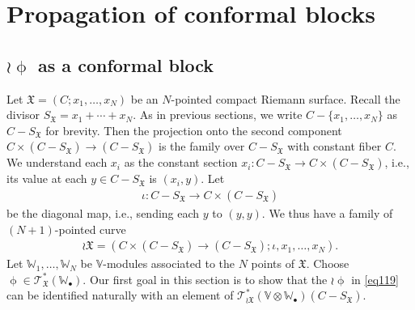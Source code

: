 \documentclass[12pt,b5paper,notitlepage]{report}
\theoremstyle{definition}
\theoremstyle{plain}
\newcommand{\fk}{\mathfrak}
\newcommand{\scr}{\mathscr}
\newcommand{\blt}{\bullet}
\newcommand{\Vbb}{\mathbb V}
\newcommand{\Wbb}{\mathbb W}
\numberwithin{equation}{section}
\begin{document}
\section{Propagation of conformal blocks}\label{lb149}



\subsection*{$\wr\upphi$ as a conformal block}


Let $\fk X=(C;x_1,\dots,x_N)$ be an $N$-pointed compact Riemann surface. Recall the divisor $S_{\fk X}=x_1+\cdots+x_N$. As in previous sections, we write $C-\{x_1,\dots,x_N\}$ as $C-S_{\fk X}$ for brevity. Then the projection onto the second component $C\times(C-S_{\fk X})\rightarrow (C-S_{\fk X})$ is the family over $C-S_{\fk X}$ with constant  fiber $C$. We understand each $x_i$ as the constant section $x_i:C-S_{\fk X}\rightarrow C\times (C-S_{\fk X})$, i.e., its value at each $y\in C-S_{\fk X}$ is $(x_i,y)$. Let
\begin{align*}
\iota:C-S_{\fk X}\rightarrow C\times (C-S_{\fk X})
\end{align*}
be the diagonal map, i.e., sending each $y$ to $(y,y)$. We thus have a family of $(N+1)$-pointed curve \index{X@$\wr\fk X,\wr\wr\fk X$}
\begin{gather}
\wr\fk X=(C\times(C-S_{\fk X})\rightarrow (C-S_{\fk X});\iota,x_1,\dots,x_N).
\end{gather}
Let $\Wbb_1,\dots,\Wbb_N$ be $\Vbb$-modules associated to the $N$ points of $\fk X$. Choose $\upphi\in\scr T_{\fk X}^*(\Wbb_\blt)$. Our first goal in this section is to show that the $\wr\upphi$  in \eqref{eq119} can be identified naturally with an element of $\scr T_{\wr\fk X}^*(\Vbb\otimes\Wbb_\blt)(C-S_{\fk X})$. 
\end{document}
